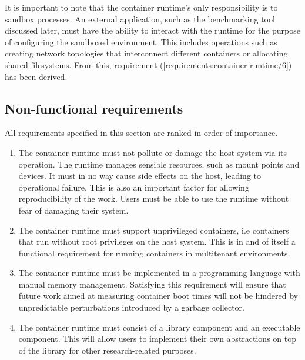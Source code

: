 It is important to note that the container runtime's only responsibility is to sandbox processes. 
An external application, such as the benchmarking tool discussed later, 
must have the ability to interact with the runtime for the purpose of configuring 
the sandboxed environment. This includes operations such as creating network topologies that interconnect 
different containers or allocating shared filesystems. From this, requirement 
(\ref{requirements:container-runtime/6}) has been derived. 

\subsection{Non-functional requirements}
All requirements specified in this section are ranked in order of importance. 
\begin{enumerate}[i]
\item The container runtime must not pollute or damage the host system via its operation.
The runtime manages sensible resources, such as mount points and devices. It must in no way 
cause side effects on the host, leading to operational failure. This is also an important factor 
for allowing reproducibility of the work. Users must be able to use the runtime without fear of 
damaging their system. 
\label{requirements:non-functional/container-runtime/1}
\item The container runtime must support unprivileged containers, i.e containers that run without 
root privileges on the host system. This is in and of itself a functional requirement for running 
containers in multitenant environments. 
\label{requirements:non-functional/container-runtime/2} 
\item The container runtime must be implemented in a programming language with manual memory management.
Satisfying this requirement will ensure that future work aimed at measuring container boot times 
will not be hindered by unpredictable perturbations introduced by a garbage collector.
\label{requirements:non-functional/container-runtime/3}
\item The container runtime must consist of a library component and an executable component. 
This will allow users to implement their own abstractions on top of the library for other research-related 
purposes. 
\end{enumerate}

